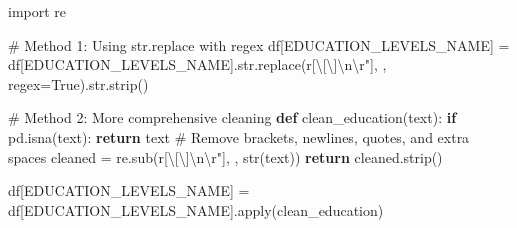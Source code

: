 \documentclass[
  letterpaper,
  DIV=11,
  numbers=noendperiod]{scrartcl}
\newenvironment{Shaded}{\begin{snugshade}}{\end{snugshade}}
\newcommand{\BuiltInTok}[1]{\textcolor[rgb]{0.00,0.23,0.31}{#1}}
\newcommand{\CommentTok}[1]{\textcolor[rgb]{0.37,0.37,0.37}{#1}}
\newcommand{\ControlFlowTok}[1]{\textcolor[rgb]{0.00,0.23,0.31}{\textbf{#1}}}
\newcommand{\ImportTok}[1]{\textcolor[rgb]{0.00,0.46,0.62}{#1}}
\newcommand{\KeywordTok}[1]{\textcolor[rgb]{0.00,0.23,0.31}{\textbf{#1}}}
\newcommand{\NormalTok}[1]{\textcolor[rgb]{0.00,0.23,0.31}{#1}}
\newcommand{\OperatorTok}[1]{\textcolor[rgb]{0.37,0.37,0.37}{#1}}
\newcommand{\StringTok}[1]{\textcolor[rgb]{0.13,0.47,0.30}{#1}}
\newcommand{\VariableTok}[1]{\textcolor[rgb]{0.07,0.07,0.07}{#1}}
\newcommand{\VerbatimStringTok}[1]{\textcolor[rgb]{0.13,0.47,0.30}{#1}}
\begin{document}
\begin{Shaded}
\begin{Highlighting}[]
\ImportTok{import}\NormalTok{ re}

\CommentTok{\# Method 1: Using str.replace with regex}
\NormalTok{df[}\StringTok{\textquotesingle{}EDUCATION\_LEVELS\_NAME\textquotesingle{}}\NormalTok{] }\OperatorTok{=}\NormalTok{ df[}\StringTok{\textquotesingle{}EDUCATION\_LEVELS\_NAME\textquotesingle{}}\NormalTok{].}\BuiltInTok{str}\NormalTok{.replace(}\VerbatimStringTok{r\textquotesingle{}[\textbackslash{}[\textbackslash{}]\textbackslash{}n\textbackslash{}r"]\textquotesingle{}}\NormalTok{, }\StringTok{\textquotesingle{}\textquotesingle{}}\NormalTok{, regex}\OperatorTok{=}\VariableTok{True}\NormalTok{).}\BuiltInTok{str}\NormalTok{.strip()}

\CommentTok{\# Method 2: More comprehensive cleaning}
\KeywordTok{def}\NormalTok{ clean\_education(text):}
    \ControlFlowTok{if}\NormalTok{ pd.isna(text):}
        \ControlFlowTok{return}\NormalTok{ text}
    \CommentTok{\# Remove brackets, newlines, quotes, and extra spaces}
\NormalTok{    cleaned }\OperatorTok{=}\NormalTok{ re.sub(}\VerbatimStringTok{r\textquotesingle{}[\textbackslash{}[\textbackslash{}]\textbackslash{}n\textbackslash{}r"]\textquotesingle{}}\NormalTok{, }\StringTok{\textquotesingle{}\textquotesingle{}}\NormalTok{, }\BuiltInTok{str}\NormalTok{(text))}
    \ControlFlowTok{return}\NormalTok{ cleaned.strip()}

\NormalTok{df[}\StringTok{\textquotesingle{}EDUCATION\_LEVELS\_NAME\textquotesingle{}}\NormalTok{] }\OperatorTok{=}\NormalTok{ df[}\StringTok{\textquotesingle{}EDUCATION\_LEVELS\_NAME\textquotesingle{}}\NormalTok{].}\BuiltInTok{apply}\NormalTok{(clean\_education)}
\end{Highlighting}
\end{Shaded}
\end{document}

